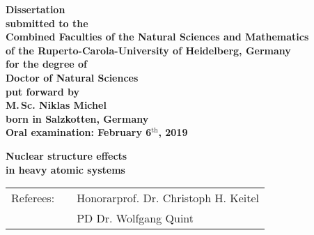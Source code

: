 
\begin{titlepage}
\begin{center}
  \renewcommand{\baselinestretch}{1.50}
  \normalsize\bfseries%
  Dissertation\\
  submitted to the\\
  Combined Faculties of the Natural Sciences and Mathematics\\
  of the Ruperto-Carola-University of Heidelberg, Germany\\
  for the degree of\\
  Doctor of Natural Sciences\\
  \vfill
  put forward by\\
  \vspace{0.5\baselineskip}
  {\Large M.$\,$Sc. Niklas Michel} \\
  \vspace{0.5\baselineskip}
  born in Salzkotten, Germany\\
  Oral examination: February 6$^{\textrm{th}}$, 2019
\end{center}
\end{titlepage}





\begin{titlepage}
\begin{center}
  \renewcommand{\baselinestretch}{1.50}
  \vspace*{1.5\baselineskip}
  \bfseries
  {\Huge Nuclear structure effects}\\\vspace{0.7\baselineskip}%
  {\Huge in heavy atomic systems}
  \vfill
  \large%
  \begin{tabular}{lp{0.5cm}l}
  Referees: && Honorarprof. Dr. Christoph H. Keitel\\
  && PD Dr. Wolfgang Quint
  \end{tabular}
\end{center}
\end{titlepage}

\renewcommand{\baselinestretch}{1.00}\normalsize


